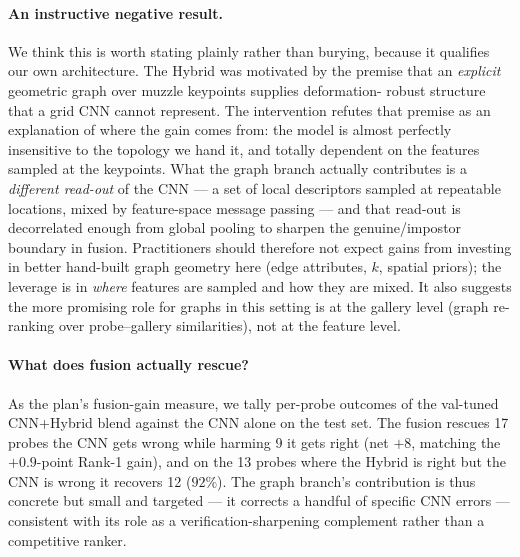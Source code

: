\documentclass[11pt]{article}
\begin{document}
\paragraph{An instructive negative result.} We think this is worth stating plainly rather
than burying, because it qualifies our own architecture. The Hybrid was motivated by the
premise that an \emph{explicit} geometric graph over muzzle keypoints supplies deformation-
robust structure that a grid CNN cannot represent. The intervention refutes that premise as
an explanation of where the gain comes from: the model is almost perfectly insensitive to
the topology we hand it, and totally dependent on the features sampled at the keypoints.
What the graph branch actually contributes is a \emph{different read-out} of the CNN --- a
set of local descriptors sampled at repeatable locations, mixed by feature-space message
passing --- and that read-out is decorrelated enough from global pooling to sharpen the
genuine/impostor boundary in fusion. Practitioners should therefore not expect gains from
investing in better hand-built graph geometry here (edge attributes, $k$, spatial priors);
the leverage is in \emph{where} features are sampled and how they are mixed. It also
suggests the more promising role for graphs in this setting is at the gallery level (graph
re-ranking over probe--gallery similarities), not at the feature level.

\paragraph{What does fusion actually rescue?} As the plan's fusion-gain measure, we tally
per-probe outcomes of the val-tuned CNN+Hybrid blend against the CNN alone on the test set.
The fusion rescues 17 probes the CNN gets wrong while harming 9 it gets right (net $+8$,
matching the $+0.9$-point Rank-1 gain), and on the 13 probes where the Hybrid is right but the
CNN is wrong it recovers 12 ($92\%$). The graph branch's contribution is thus concrete but
small and targeted --- it corrects a handful of specific CNN errors --- consistent with its
role as a verification-sharpening complement rather than a competitive ranker.
\end{document}
